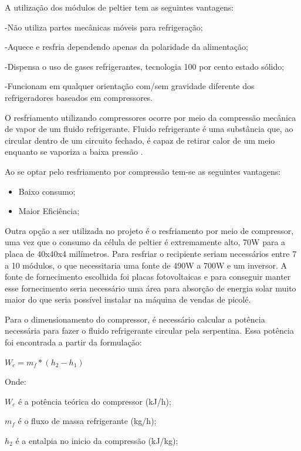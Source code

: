 A utilização dos módulos de peltier tem as seguintes vantagens:

-Não utiliza partes mecânicas móveis para refrigeração;

-Aquece e resfria dependendo apenas da polaridade da alimentação;

-Dispensa o uso de gases refrigerantes, tecnologia 100 por cento estado sólido;

-Funcionam em qualquer orientação com/sem gravidade diferente dos refrigeradores baseados em compressores.


O resfriamento utilizando compressores ocorre por meio da compressão mecânica de vapor de um fluido refrigerante. Fluido refrigerante é uma substância que, ao circular dentro de um circuito fechado, é capaz de retirar calor de um meio enquanto se vaporiza a baixa pressão \cite{teixeiraconcepccao}.

Ao se optar pelo resfriamento por compressão tem-se as seguintes vantagens:

\begin{itemize}
\item Baixo consumo;

\item Maior Eficiência;
\end{itemize}


Outra opção a ser utilizada no projeto é o resfriamento por meio de compressor, uma vez que o consumo da célula de peltier é extremamente alto, 70W para a placa de 40x40x4 milímetros. Para resfriar o recipiente seriam necessários entre 7 a 10 módulos, o que necessitaria uma fonte de 490W a 700W e um inversor. A fonte de fornecimento escolhida foi placas fotovoltaicas e para conseguir manter esse fornecimento seria necessário uma área para absorção de energia solar muito maior do que seria possível instalar na máquina de vendas de picolé.


Para o dimensionamento do compressor, é necessário calcular a potência necessária para fazer o fluido refrigerante circular pela serpentina. Essa potência foi encontrada a
partir da formulação:

\begin{math} W_{c} = m_{f} * (h_{2} - h_{1})  \end{math}

Onde:

$W_{c}$ é a potência teórica do compressor (kJ/h);

$m_{f}$ é o fluxo de massa refrigerante (kg/h);

$h_{2}$ é a entalpia no inicio da compressão (kJ/kg);

